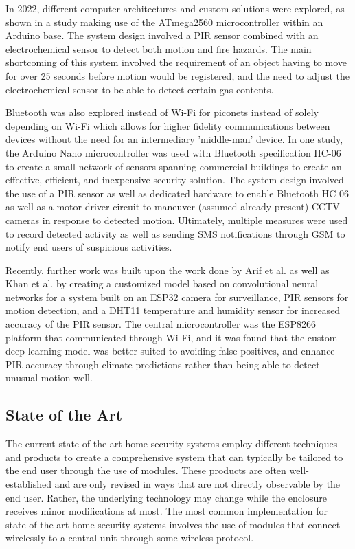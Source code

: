In 2022, different computer architectures and custom solutions were explored,
as shown in a study making use of the ATmega2560 microcontroller within an Arduino base. The
system design involved a PIR sensor combined with an electrochemical sensor to detect both
motion and fire hazards. The main shortcoming of this system involved the requirement of an
object having to move for over 25 seconds before motion would be registered, and the need to
adjust the electrochemical sensor to be able to detect certain gas contents.
\cite{rhizmaSuhendar2022}

Bluetooth was also explored instead of Wi-Fi for piconets instead of solely depending on
Wi-Fi which allows for higher fidelity communications between devices without the need for an
intermediary 'middle-man' device. In one study, the Arduino Nano microcontroller was used
with Bluetooth specification HC-06 to create a small network of sensors spanning commercial
buildings to create an effective, efficient, and inexpensive security solution. The system
design involved the use of a PIR sensor as well as dedicated hardware to enable Bluetooth HC
06 as well as a motor driver circuit to maneuver (assumed already-present) CCTV cameras in
response to detected motion. Ultimately, multiple measures were used to record detected
activity as well as sending SMS notifications through GSM to notify end users of suspicious
activities. \cite{HameedEtAl2022}

Recently, further work was built upon the work done by Arif et al. as well as Khan et al. by
creating a customized model based on convolutional neural networks for a system built on an
ESP32 camera for surveillance, PIR sensors for motion detection, and a DHT11 temperature and
humidity sensor for increased accuracy of the PIR sensor. The central microcontroller was the
ESP8266 platform that communicated through Wi-Fi, and it was found that the custom deep
learning model was better suited to avoiding false positives, and enhance PIR accuracy
through climate predictions rather than being able to detect unusual motion well.
\cite{TaiwoEtAl2022}

\subsection{State of the Art}\label{subsec:state-of-the-art}

The current state-of-the-art home security systems employ different techniques and products
to create a comprehensive system that can typically be tailored to the end user through the
use of modules. These products are often well-established and are only revised in ways that
are not directly observable by the end user. Rather, the underlying technology may change
while the enclosure receives minor modifications at most. \cite{sarhan2020} The most common
implementation for state-of-the-art home security systems involves the use of modules that
connect wirelessly to a central unit through some wireless protocol. \cite{joseMalekian2017}
\cite{chowdhuryAhmed2021} \cite{WahyuniEtAl2021} \cite{rhizmaSuhendar2022}
\cite{HameedEtAl2022}

